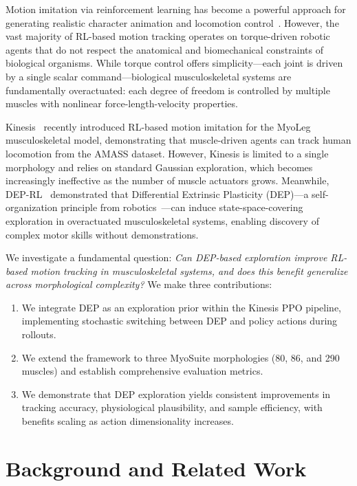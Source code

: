 \documentclass[10pt,twocolumn]{article}
\begin{document}
Motion imitation via reinforcement learning has become a powerful approach for generating realistic character animation and locomotion control~\citep{peng2018deepmimic}. However, the vast majority of RL-based motion tracking operates on torque-driven robotic agents that do not respect the anatomical and biomechanical constraints of biological organisms. While torque control offers simplicity---each joint is driven by a single scalar command---biological musculoskeletal systems are fundamentally overactuated: each degree of freedom is controlled by multiple muscles with nonlinear force-length-velocity properties.

Kinesis~\citep{kinesis2024} recently introduced RL-based motion imitation for the MyoLeg musculoskeletal model, demonstrating that muscle-driven agents can track human locomotion from the AMASS dataset. However, Kinesis is limited to a single morphology and relies on standard Gaussian exploration, which becomes increasingly ineffective as the number of muscle actuators grows. Meanwhile, DEP-RL~\citep{deprl2023} demonstrated that Differential Extrinsic Plasticity (DEP)---a self-organization principle from robotics~\citep{der2015novel}---can induce state-space-covering exploration in overactuated musculoskeletal systems, enabling discovery of complex motor skills without demonstrations.

We investigate a fundamental question: \textit{Can DEP-based exploration improve RL-based motion tracking in musculoskeletal systems, and does this benefit generalize across morphological complexity?} We make three contributions:

\begin{enumerate}[leftmargin=*, nosep]
\item We integrate DEP as an exploration prior within the Kinesis PPO pipeline, implementing stochastic switching between DEP and policy actions during rollouts.
\item We extend the framework to three MyoSuite morphologies (80, 86, and 290 muscles) and establish comprehensive evaluation metrics.
\item We demonstrate that DEP exploration yields consistent improvements in tracking accuracy, physiological plausibility, and sample efficiency, with benefits scaling as action dimensionality increases.
\end{enumerate}

\section{Background and Related Work}
\label{sec:related}
\end{document}

